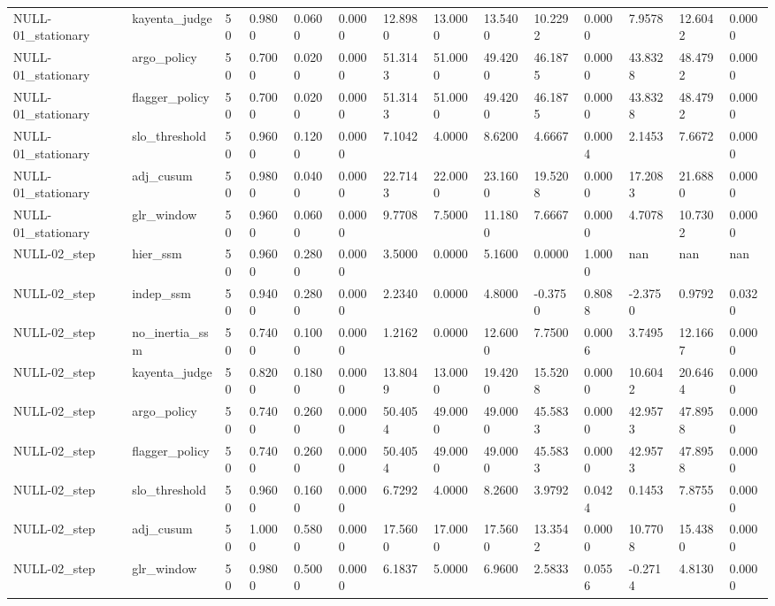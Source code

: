 \begin{table}[htbp]
\begin{tabular}{llllllllllllll}
NULL-01\_stationary & kayenta\_judge & 50 & 0.9800 & 0.0600 & 0.0000 & 12.8980 & 13.0000 & 13.5400 & 10.2292 & 0.0000 & 7.9578 & 12.6042 & 0.0000 \\
NULL-01\_stationary & argo\_policy & 50 & 0.7000 & 0.0200 & 0.0000 & 51.3143 & 51.0000 & 49.4200 & 46.1875 & 0.0000 & 43.8328 & 48.4792 & 0.0000 \\
NULL-01\_stationary & flagger\_policy & 50 & 0.7000 & 0.0200 & 0.0000 & 51.3143 & 51.0000 & 49.4200 & 46.1875 & 0.0000 & 43.8328 & 48.4792 & 0.0000 \\
NULL-01\_stationary & slo\_threshold & 50 & 0.9600 & 0.1200 & 0.0000 & 7.1042 & 4.0000 & 8.6200 & 4.6667 & 0.0004 & 2.1453 & 7.6672 & 0.0000 \\
NULL-01\_stationary & adj\_cusum & 50 & 0.9800 & 0.0400 & 0.0000 & 22.7143 & 22.0000 & 23.1600 & 19.5208 & 0.0000 & 17.2083 & 21.6880 & 0.0000 \\
NULL-01\_stationary & glr\_window & 50 & 0.9600 & 0.0600 & 0.0000 & 9.7708 & 7.5000 & 11.1800 & 7.6667 & 0.0000 & 4.7078 & 10.7302 & 0.0000 \\
NULL-02\_step & hier\_ssm & 50 & 0.9600 & 0.2800 & 0.0000 & 3.5000 & 0.0000 & 5.1600 & 0.0000 & 1.0000 & nan & nan & nan \\
NULL-02\_step & indep\_ssm & 50 & 0.9400 & 0.2800 & 0.0000 & 2.2340 & 0.0000 & 4.8000 & -0.3750 & 0.8088 & -2.3750 & 0.9792 & 0.0320 \\
NULL-02\_step & no\_inertia\_ssm & 50 & 0.7400 & 0.1000 & 0.0000 & 1.2162 & 0.0000 & 12.6000 & 7.7500 & 0.0006 & 3.7495 & 12.1667 & 0.0000 \\
NULL-02\_step & kayenta\_judge & 50 & 0.8200 & 0.1800 & 0.0000 & 13.8049 & 13.0000 & 19.4200 & 15.5208 & 0.0000 & 10.6042 & 20.6464 & 0.0000 \\
NULL-02\_step & argo\_policy & 50 & 0.7400 & 0.2600 & 0.0000 & 50.4054 & 49.0000 & 49.0000 & 45.5833 & 0.0000 & 42.9573 & 47.8958 & 0.0000 \\
NULL-02\_step & flagger\_policy & 50 & 0.7400 & 0.2600 & 0.0000 & 50.4054 & 49.0000 & 49.0000 & 45.5833 & 0.0000 & 42.9573 & 47.8958 & 0.0000 \\
NULL-02\_step & slo\_threshold & 50 & 0.9600 & 0.1600 & 0.0000 & 6.7292 & 4.0000 & 8.2600 & 3.9792 & 0.0424 & 0.1453 & 7.8755 & 0.0000 \\
NULL-02\_step & adj\_cusum & 50 & 1.0000 & 0.5800 & 0.0000 & 17.5600 & 17.0000 & 17.5600 & 13.3542 & 0.0000 & 10.7708 & 15.4380 & 0.0000 \\
NULL-02\_step & glr\_window & 50 & 0.9800 & 0.5000 & 0.0000 & 6.1837 & 5.0000 & 6.9600 & 2.5833 & 0.0556 & -0.2714 & 4.8130 & 0.0000 \\

\end{tabular}
\end{table}
